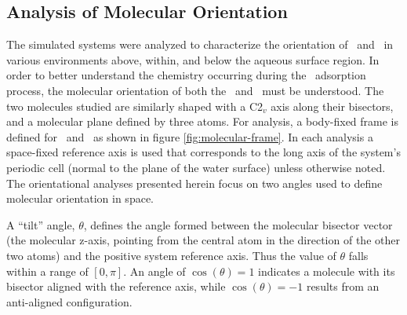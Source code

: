 

\subsection{Analysis of Molecular Orientation}

	The simulated systems were analyzed to characterize the orientation of \wat~and \suldiox~in various environments above, within, and below the aqueous surface region. In order to better understand the chemistry occurring during the \suldiox~adsorption process, the molecular orientation of both the \wat~and \suldiox~must be understood.  The two molecules studied are similarly shaped with a C2$_v$ axis along their bisectors, and a molecular plane defined by three atoms. For analysis, a body-fixed frame is defined for \wat~and \suldiox~as shown in figure \ref{fig:molecular-frame}. In each analysis a space-fixed reference axis is used that corresponds to the long axis of the system's periodic cell (normal to the plane of the water surface) unless otherwise noted. The orientational analyses presented herein focus on two angles used to define molecular orientation in space. 
	
	A ``tilt'' angle, $\theta$, defines the angle formed between the molecular bisector vector (the molecular z-axis, pointing from the central atom in the direction of the other two atoms) and the positive system reference axis. Thus the value of $\theta$ falls within a range of $[0,\pi]$. An angle of $\cos(\theta)=1$ indicates a molecule with its bisector aligned with the reference axis, while $\cos(\theta)=-1$ results from an anti-aligned configuration. 
	
